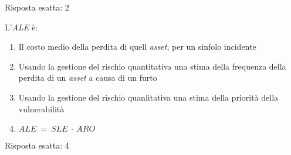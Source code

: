 \begin{Answer} [
  ref={gestRisk9},
  number={9}
  ]

  \Question Risposta esatta: 2

\end{Answer}



\begin{Exercise} [
  title={Quiz},
  label={gestRisk10}
  ]

  \Question L'\textit{ALE} \`e:
\begin{enumerate}
 \item Il costo medio della perdita di quell \textit{asset}, per un sinfolo
incidente
 \item Usando la gestione del rischio quantitativa una stima della frequenza
della perdita di un \textit{asset} a causa di un furto
 \item Usando la gestione del rischio quanlitativa una stima della priorit\`a
della vulnerabilit\`a
 \item $ALE\ =\ SLE\ \cdot\ ARO$
\end{enumerate}

\end{Exercise}


\begin{Answer} [
  ref={gestRisk10},
  number={10}
  ]

  \Question Risposta esatta: 4

\end{Answer}
